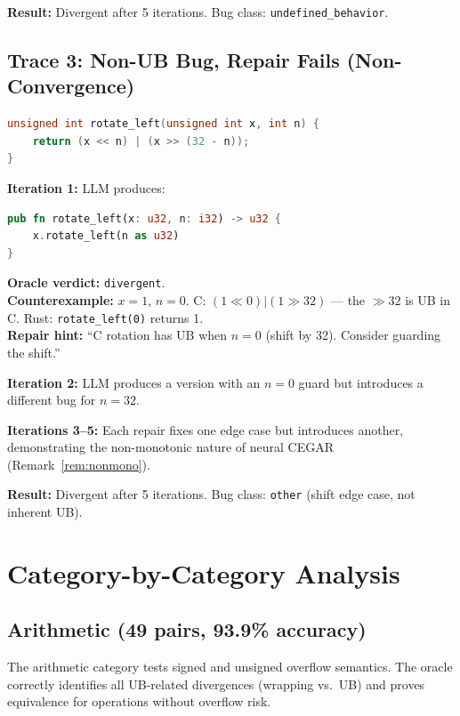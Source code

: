 \documentclass[11pt]{article}
\begin{document}
\textbf{Result:} Divergent after 5 iterations.  Bug class:
\texttt{undefined\_behavior}.

\subsection{Trace 3: Non-UB Bug, Repair Fails (Non-Convergence)}

\begin{lstlisting}[language=C,caption={C source: \texttt{rotate\_left}.}]
unsigned int rotate_left(unsigned int x, int n) {
    return (x << n) | (x >> (32 - n));
}
\end{lstlisting}

\noindent\textbf{Iteration 1:} LLM produces:
\begin{lstlisting}[language=Rust,caption={Rust translation attempt 1 (incorrect).}]
pub fn rotate_left(x: u32, n: i32) -> u32 {
    x.rotate_left(n as u32)
}
\end{lstlisting}

\noindent\textbf{Oracle verdict:} \texttt{divergent}.\\
\textbf{Counterexample:} $x = 1$, $n = 0$.
C: $(1 \ll 0) | (1 \gg 32)$ --- the $\gg 32$ is UB in C.
Rust: \texttt{rotate\_left(0)} returns 1.\\
\textbf{Repair hint:} ``C rotation has UB when $n=0$ (shift by 32).
Consider guarding the shift.''

\noindent\textbf{Iteration 2:} LLM produces a version with an $n=0$ guard
but introduces a different bug for $n=32$.

\noindent\textbf{Iterations 3--5:} Each repair fixes one edge case but
introduces another, demonstrating the non-monotonic nature of neural CEGAR
(Remark~\ref{rem:nonmono}).

\textbf{Result:} Divergent after 5 iterations.  Bug class: \texttt{other}
(shift edge case, not inherent UB).

\section{Category-by-Category Analysis}\label{app:categories}

\subsection{Arithmetic (49 pairs, 93.9\% accuracy)}

The arithmetic category tests signed and unsigned overflow semantics.  The
oracle correctly identifies all UB-related divergences (wrapping vs.\ UB)
and proves equivalence for operations without overflow risk.
\end{document}
